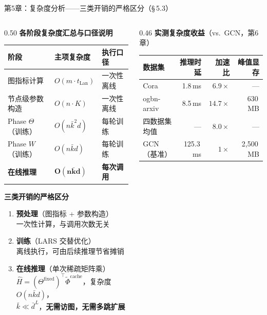 \documentclass[aspectratio=169,9pt,xcolor=dvipsnames]{beamer}
\newcommand{\highlight}[1]{\textcolor{myred}{\textbf{#1}}}
\newcommand{\blue}[1]{\textcolor{mynavy}{#1}}
\newcommand{\kbar}{\ensuremath{\bar{k}}}
\begin{document}
\begin{frame}{第5章：复杂度分析——三类开销的严格区分（§\,5.3）}
\begin{columns}[T]

\begin{column}{0.50\textwidth}
  \textbf{\blue{各阶段复杂度汇总与口径说明}}

  \vspace{0.1cm}
  \begin{tabular}{m{2.0cm}m{1.6cm}m{1.8cm}}
    \toprule
    \textbf{阶段} & \textbf{主项复杂度} & \textbf{执行口径} \\
    \midrule
    图指标计算 & $O(m\cdot t_{\mathrm{Lan}})$ & 一次性离线 \\
    节点级参数构造 & $O(n\cdot K)$ & 一次性离线 \\
    Phase $\Theta$（训练） & $O(n\kbar^2 d)$ & 每轮训练 \\
    Phase $W$（训练） & $O(n\kbar d)$ & 每轮训练 \\
    \textbf{在线推理} & $\boldsymbol{O(n\kbar d)}$ & \textbf{每次调用} \\
    \bottomrule
  \end{tabular}

  \vspace{0.2cm}
  \textbf{三类开销的严格区分}
  \begin{enumerate}\setlength{\itemsep}{4pt}
    \item \highlight{预处理}（图指标 + 参数构造）\\
      一次性计算，与调用次数无关
    \item \highlight{训练}（LARS 交替优化）\\
      离线执行，可由后续推理节省摊销
    \item \highlight{在线推理}（单次稀疏矩阵乘）\\
      $\hat{H}=(\Theta^{\mathrm{fixed}})^\top\tilde{\Phi}^{\mathrm{cache}}$，复杂度 $O(n\kbar d)$，\\
      $\kbar\ll\bar{d}^L$，\textbf{无需访图，无需多跳扩展}
  \end{enumerate}
\end{column}

\begin{column}{0.46\textwidth}
  \textbf{\blue{实测复杂度收益}}（vs.\ GCN，第6章）

  \vspace{0.1cm}
  \begin{tabular}{lrrr}
    \toprule
    数据集 & 推理时延 & 加速比 & 峰值显存 \\
    \midrule
    Cora      & 1.8\,ms  & $6.9\times$  & —      \\
    ogbn-arxiv & 8.5\,ms & \highlight{$14.7\times$} & 630\,MB \\
    四数据集均值 & — & \blue{$8.0\times$} & — \\
    \midrule
    GCN（基准） & 125.3\,ms & $1\times$ & 2,500\,MB \\
    \bottomrule
  \end{tabular}


\end{column}
\end{columns}
\end{frame}
\end{document}
